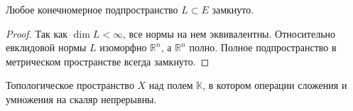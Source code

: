 \begin{corollary}\label{closeness-subspace}
	Любое конечномерное подпространство $L \subset E$ замкнуто.
\end{corollary}

\begin{proof}
	Так как $\dim L < \infty$, все нормы на нем эквивалентны. Относительно евклидовой нормы $L$ изоморфно $\mathbb{R}^n$, а $\mathbb{R}^n$ полно.
	Полное подпространство в метрическом пространстве всегда замкнуто.
\end{proof}

\begin{definition}
	Топологическое пространство $X$ над полем $\mathbb{K}$, в котором операции сложения и умножения на скаляр непрерывны.
\end{definition}